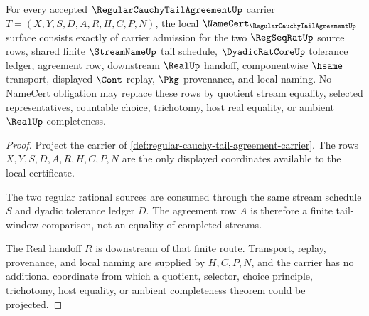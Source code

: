 \begin{theorem}
\label{thm:regular-cauchy-tail-agreement-namecert-obligations}
For every accepted $\RegularCauchyTailAgreementUp$ carrier $T=(X,Y,S,D,A,R,H,C,P,N)$, the local $\NameCert_{\RegularCauchyTailAgreementUp}$ surface consists exactly of carrier admission for the two $\RegSeqRatUp$ source rows, shared finite $\StreamNameUp$ tail schedule, $\DyadicRatCoreUp$ tolerance ledger, agreement row, downstream $\RealUp$ handoff, componentwise $\hsame$ transport, displayed $\Cont$ replay, $\Pkg$ provenance, and local naming. No NameCert obligation may replace these rows by quotient stream equality, selected representatives, countable choice, trichotomy, host real equality, or ambient $\RealUp$ completeness.
\end{theorem}
\begin{proof}
Project the carrier of \autoref{def:regular-cauchy-tail-agreement-carrier}. The rows $X,Y,S,D,A,R,H,C,P,N$ are the only displayed coordinates available to the local certificate.

The two regular rational sources are consumed through the same stream schedule $S$ and dyadic tolerance ledger $D$. The agreement row $A$ is therefore a finite tail-window comparison, not an equality of completed streams.

The Real handoff $R$ is downstream of that finite route. Transport, replay, provenance, and local naming are supplied by $H,C,P,N$, and the carrier has no additional coordinate from which a quotient, selector, choice principle, trichotomy, host equality, or ambient completeness theorem could be projected.
\end{proof}

